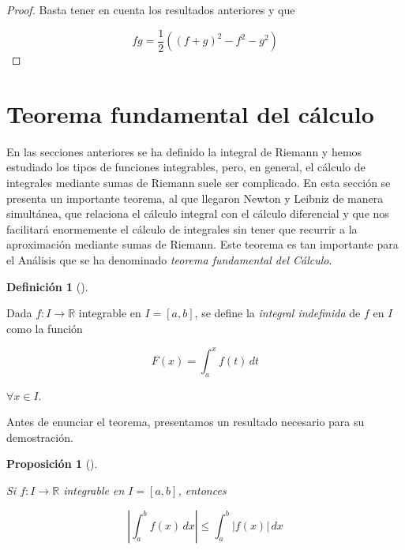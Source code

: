 \documentclass[
  a4paper,
]{scrreport}
\theoremstyle{definition}
\theoremstyle{plain}
\theoremstyle{definition}
\newtheorem{definition}{Definición}[chapter]
\theoremstyle{definition}
\theoremstyle{plain}
\theoremstyle{plain}
\newtheorem{proposition}{Proposición}[chapter]
\theoremstyle{remark}
\begin{document}
\begin{tcolorbox}[enhanced jigsaw, leftrule=.75mm, colbacktitle=quarto-callout-note-color!10!white, toprule=.15mm, opacityback=0, opacitybacktitle=0.6, toptitle=1mm, breakable, bottomtitle=1mm, colframe=quarto-callout-note-color-frame, rightrule=.15mm, titlerule=0mm, title=\textcolor{quarto-callout-note-color}{\faInfo}\hspace{0.5em}{Demostración}, arc=.35mm, left=2mm, bottomrule=.15mm, colback=white, coltitle=black]

\begin{proof}
Basta tener en cuenta los resultados anteriores y que

\[
fg = \frac{1}{2}((f+g)^2-f^2-g^2)
\]
\end{proof}

\end{tcolorbox}

\section{Teorema fundamental del
cálculo}\label{teorema-fundamental-del-cuxe1lculo}

En las secciones anteriores se ha definido la integral de Riemann y
hemos estudiado los tipos de funciones integrables, pero, en general, el
cálculo de integrales mediante sumas de Riemann suele ser complicado. En
esta sección se presenta un importante teorema, al que llegaron Newton y
Leibniz de manera simultánea, que relaciona el cálculo integral con el
cálculo diferencial y que nos facilitará enormemente el cálculo de
integrales sin tener que recurrir a la aproximación mediante sumas de
Riemann. Este teorema es tan importante para el Análisis que se ha
denominado \emph{teorema fundamental del Cálculo}.

\begin{definition}[]\protect\hypertarget{def-integral-indefinida}{}\label{def-integral-indefinida}

Dada \(f:I\to\mathbb{R}\) integrable en \(I=[a,b]\), se define la
\emph{integral indefinida} de \(f\) en \(I\) como la función

\[
F(x) = \int_a^x f(t)\, dt
\]

\(\forall x\in I\).

\end{definition}

Antes de enunciar el teorema, presentamos un resultado necesario para su
demostración.

\begin{proposition}[]\protect\hypertarget{prp-integral-valor-absoluto}{}\label{prp-integral-valor-absoluto}

Si \(f:I\to\mathbb{R}\) integrable en \(I=[a,b]\), entonces

\[
\left|\int_a^b f(x)\,dx\right| \leq \int_a^b |f(x)|\,dx
\]

\end{proposition}
\end{document}
